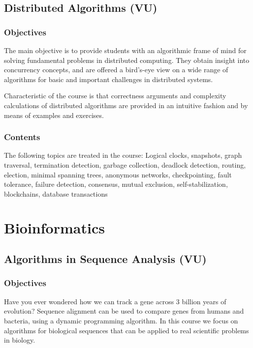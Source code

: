 \documentclass[11pt]{article}
\begin{document}
\subsection{Distributed Algorithms (VU)}
\label{sec:org344799d}

\subsubsection{Objectives}
\label{sec:org7c78d20}

The main objective is to provide students with an algorithmic frame of
mind for solving fundamental problems in distributed computing. They
obtain insight into concurrency concepts, and are offered a bird's-eye
view on a wide range of algorithms for basic and important challenges in
distributed systems.

Characteristic of the course is that correctness arguments and
complexity calculations of distributed algorithms are provided in an
intuitive fashion and by means of examples and exercises.

\subsubsection{Contents}
\label{sec:org2dda402}

The following topics are treated in the course: Logical clocks,
snapshots, graph traversal, termination detection, garbage collection,
deadlock detection, routing, election, minimal spanning trees, anonymous
networks, checkpointing, fault tolerance, failure detection, consensus,
mutual exclusion, self-stabilization, blockchains, database transactions

\section{Bioinformatics}
\label{sec:org2828b27}

\subsection{Algorithms in Sequence Analysis (VU)}
\label{sec:org087d7e4}

\subsubsection{Objectives}
\label{sec:org5bbfe3f}

Have you ever wondered how we can track a gene across 3 billion years of
evolution? Sequence alignment can be used to compare genes from humans and
bacteria, using a dynamic programming algorithm. In this course we focus on
algorithms for biological sequences that can be applied to real scientific
problems in biology.
\end{document}

